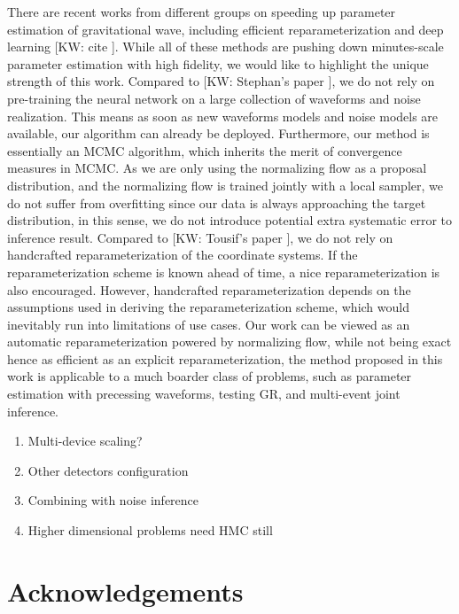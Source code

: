 \documentclass[twocolumn]{aastex631}
\newcommand{\kw}[1]{{\color{rb4}[KW: #1 ]}}
\begin{document}
There are recent works from different groups on speeding up parameter estimation
of gravitational wave, including efficient reparameterization and deep learning
\kw{cite}. While all of these methods are pushing down minutes-scale parameter
estimation with high fidelity, we would like to highlight the unique strength of
this work. Compared to \kw{Stephan's paper}, we do not rely on pre-training the
neural network on a large collection of waveforms and noise realization. This
means as soon as new waveforms models and noise models are available, our
algorithm can already be deployed. Furthermore, our method is essentially an
MCMC algorithm, which inherits the merit of convergence measures in MCMC. As we
are only using the normalizing flow as a proposal distribution, and the
normalizing flow is trained jointly with a local sampler, we do not suffer from
overfitting since our data is always approaching the target distribution, in
this sense, we do not introduce potential extra systematic error to inference
result. Compared to \kw{Tousif's paper}, we do not rely on handcrafted
reparameterization of the coordinate systems. If the reparameterization scheme
is known ahead of time, a nice reparameterization is also encouraged. However,
handcrafted reparameterization depends on the assumptions used in deriving the
reparameterization scheme, which would inevitably run into limitations of use
cases. Our work can be viewed as an automatic reparameterization powered by
normalizing flow, while not being exact hence as efficient as an explicit
reparameterization, the method proposed in this work is applicable to a much
boarder class of problems, such as parameter estimation with precessing
waveforms, testing GR, and multi-event joint inference.



\begin{enumerate}
    \item Multi-device scaling?
    \item Other detectors configuration
    \item  Combining with noise inference
    \item Higher dimensional problems need HMC still
\end{enumerate}



\section{Acknowledgements}


\end{document}

